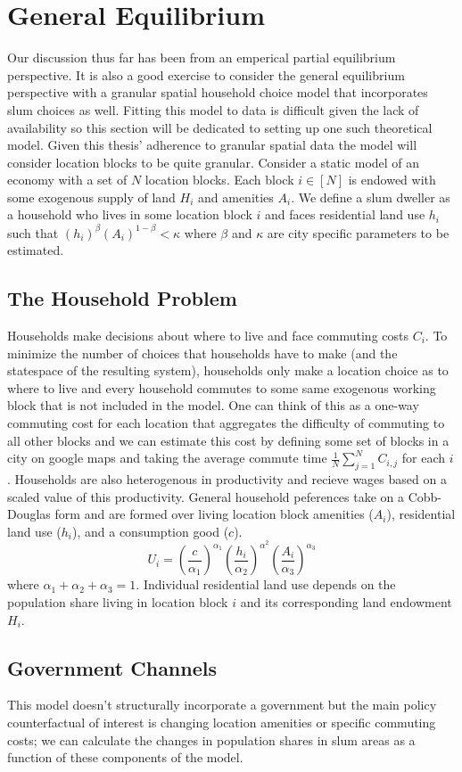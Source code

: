 \section{General Equilibrium}

Our discussion thus far has been from an emperical partial equilibrium perspective. It is also a good exercise to consider the general equilibrium perspective with a granular spatial household choice model that incorporates slum choices as well. Fitting this model to data is difficult given the lack of availability so this section will be dedicated to setting up one such theoretical model. Given this thesis' adherence to granular spatial data the model will consider location blocks to be quite granular. Consider a static model of an economy with a set of $N$ location blocks. Each block $i\in [N]$ is endowed with some exogenous supply of land $H_i$ and amenities $A_i$. We define a slum dweller as a household who lives in some location block $i$ and faces residential land use $h_i$ such that $(h_i)^{\beta}(A_i)^{1-\beta} < \kappa$ where $\beta$ and $\kappa$ are city specific parameters to be estimated. 

\subsection{The Household Problem}

Households make decisions about where to live and face commuting costs $C_i$. To minimize the number of choices that households have to make (and the statespace of the resulting system), households only make a location choice as to where to live and every household commutes to some same exogenous working block that is not included in the model. One can think of this as a one-way commuting cost for each location that aggregates the difficulty of commuting to all other blocks and we can estimate this cost by defining some set of blocks in a city on google maps and taking the average commute time $\frac{1}{N}\sum_{j=1}^N C_{i,j}$ for each $i$. Households are also heterogenous in productivity and recieve wages based on a scaled value of this productivity. General household peferences take on a Cobb-Douglas form and are formed over living location block amenities ($A_i$), residential land use ($h_i$), and a consumption good ($c$). $$U_i = \left(\frac{c}{\alpha_1}\right)^{\alpha_1}\left(\frac{h_i}{\alpha_2}\right)^{\alpha^2}\left(\frac{A_i}{\alpha_3}\right)^{\alpha_3}$$ where $\alpha_1 + \alpha_2 + \alpha_3 = 1$. Individual residential land use depends on the population share living in location block $i$ and its corresponding land endowment $H_i$.

\subsection{Government Channels}
This model doesn't structurally incorporate a government but the main policy counterfactual of interest is changing location amenities or specific commuting costs; we can calculate the changes in population shares in slum areas as a function of these components of the model.
